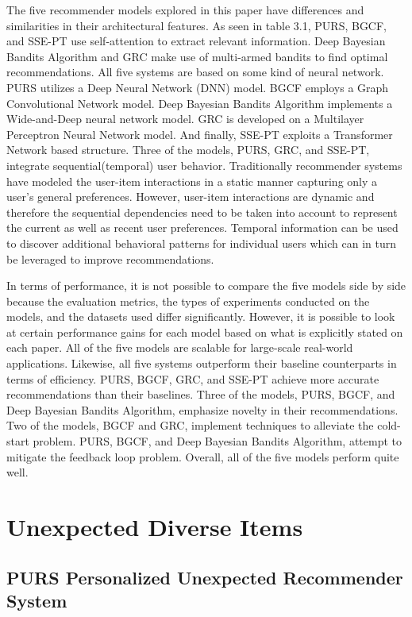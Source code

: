 The five recommender models explored in this paper have differences and similarities in their architectural features. As seen in table 3.1, PURS, BGCF, and SSE-PT use self-attention to extract relevant information. Deep Bayesian Bandits Algorithm and GRC make use of multi-armed bandits to find optimal recommendations. All five systems are based on some kind of neural network. PURS utilizes a Deep Neural Network (DNN) model. BGCF employs a Graph Convolutional Network model. Deep Bayesian Bandits Algorithm implements a Wide-and-Deep neural network model. GRC is developed on a Multilayer Perceptron Neural Network model. And finally, SSE-PT exploits a Transformer Network based structure. Three of the models, PURS, GRC, and SSE-PT, integrate sequential(temporal) user behavior. Traditionally recommender systems have modeled the user-item interactions in a static manner capturing only a user's general preferences. However, user-item interactions are dynamic and therefore the sequential dependencies need to be taken into account to represent the current as well as recent user preferences. Temporal information can be used to discover additional behavioral patterns for individual users which can in turn be leveraged to improve recommendations.

In terms of performance, it is not possible to compare the five models side by side because the evaluation metrics, the types of experiments conducted on the models, and the datasets used differ significantly. However, it is possible to look at certain performance gains for each model based on what is explicitly stated on each paper. All of the five models are scalable for large-scale real-world applications. Likewise, all five systems outperform their baseline counterparts in terms of efficiency. PURS, BGCF, GRC, and SSE-PT achieve more accurate recommendations than their baselines. Three of the models, PURS, BGCF, and Deep Bayesian Bandits Algorithm, emphasize novelty in their recommendations. Two of the models, BGCF and GRC, implement techniques to alleviate the cold-start problem. PURS, BGCF, and Deep Bayesian Bandits Algorithm, attempt to mitigate the feedback loop problem. Overall, all of the five models perform quite well. 

\chapter{Unexpected Diverse Items}
\section{PURS Personalized Unexpected Recommender System}

